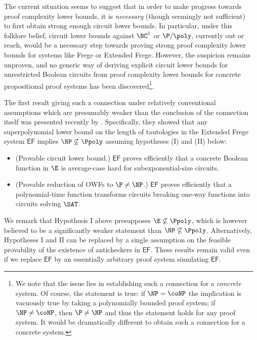 \documentclass[11pt]{article}
\newcommand{\EF}{\mathsf{EF}}
\theoremstyle{definition}
\theoremstyle{plain}
\theoremstyle{remark}
\begin{document}
The current situation seems to suggest that in order to make progress towards proof complexity lower bounds, it is \emph{necessary} (though seemingly not sufficient) to first obtain strong enough circuit lower bounds. In particular, under this folklore belief, circuit lower bounds against $\NC^1$ or $\P/\poly$, currently out or reach, would be a necessary step towards proving strong proof complexity lower bounds for systems like Frege or Extended Frege. However, the suspicion remains unproven, and no generic way of deriving explicit circuit lower bounds for unrestricted Boolean circuits from proof complexity lower bounds for concrete propositional proof systems has been discovered\footnote{We note that the issue lies in establishing such a connection for a \emph{concrete} system. Of course, the statement  is true: if $\NP = \coNP$ the implication is vacuously true by taking a polynomially bounded proof system; if $\NP \neq \coNP$, then $\P \neq \NP$ and thus the statement holds for any proof system. It would be dramatically different to obtain such a connection for a concrete system.}.

The first result giving such a connection under relatively conventional assumptions which are presumably weaker than the conclusion of the connection itself was presented recently by \citeauthor{Pseopt} \cite{Pseopt}. Specifically, they showed that any superpolynomial lower bound on the length of tautologies in the Extended Frege system $\EF$ implies $\NP\not\subseteq\Ppoly$ assuming hypotheses (I) and (II) below:

\begin{itemize}
\item[\textsc{I}.] (Provable circuit lower bound.) $\EF$ proves efficiently that a concrete Boolean function in $\E$ is average-case hard for subexponential-size circuits.

\item[\textsc{II}.] (Provable reduction of OWFs to $\P\neq\NP$.) $\EF$ proves efficiently that a polynomial-time function transforms circuits breaking one-way functions into circuits solving $\SAT$.
\end{itemize}

We remark that Hypothesis I above presupposes $\E\not\subseteq\Ppoly$, which is however believed to be a significantly weaker statement than $\NP\not\subseteq\Ppoly$. Alternatively, Hypotheses I and II can be replaced by a single assumption on the feasible provability of the existence of anticheckers in $\EF$. These results remain valid even if we replace $\EF$ by an essentially arbitrary proof system simulating $\EF$.
\end{document}
